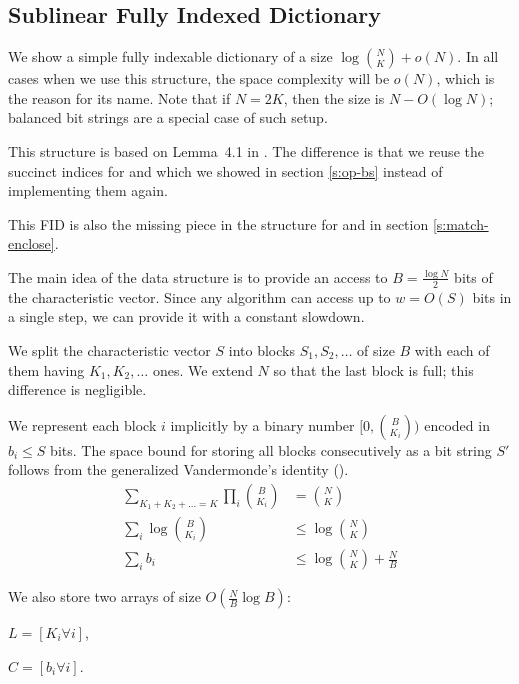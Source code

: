 \subsection{Sublinear Fully Indexed Dictionary}\label{ss:sublinear-fid}

We show a simple fully indexable dictionary of a size $\log {N \choose K} + o(N)$.
In all cases when we use this structure, the space complexity will be $o(N)$, which is the reason for its name.
Note that if $N = 2K$, then the size is $N - O(\log N)$; balanced bit strings are a special case of such setup.

This structure is based on Lemma~4.1 in \cite{raman2007succinct}.
The difference is that we reuse the succinct indices for \rank{} and \select{} which we showed in section \ref{s:op-bs} instead of implementing them again.

This FID is also the missing piece in the structure for \match{} and \enclose{} in section \ref{s:match-enclose}.

\bigbreak

The main idea of the data structure is to provide an access to $B = \frac{\log N}{2}$ bits of the characteristic vector.
Since any algorithm can access up to $w = O(S)$ bits in a single step, we can provide it with a constant slowdown.

We split the characteristic vector $S$ into blocks $S_1, S_2, \ldots$ of size $B$ with each of them having $K_1, K_2, \ldots$ ones.
We extend $N$ so that the last block is full; this difference is negligible.

We represent each block $i$ implicitly by a binary number $[0, {B \choose K_i})$ encoded in $b_i \le S$ bits.
The space bound for storing all blocks consecutively as a bit string $S'$ follows from the generalized Vandermonde's identity (\cite{belbachircombinatorial}).
\begin{align*}
	\sum_{K_1 + K_2 + \dots = K} \prod_i {B \choose K_i} &= {N \choose K} \\
	\sum_i \log {B \choose K_i} &\le \log {N \choose K} \\
	\sum_i b_i &\le \log {N \choose K} + \frac{N}{B}
\end{align*}

We also store two arrays of size $O(\frac{N}{B} \log B)$:
\begin{iteminline}
	\item $L = [K_i \forall i]$,
	\item $C = [b_i \forall i]$.
\end{iteminline}

